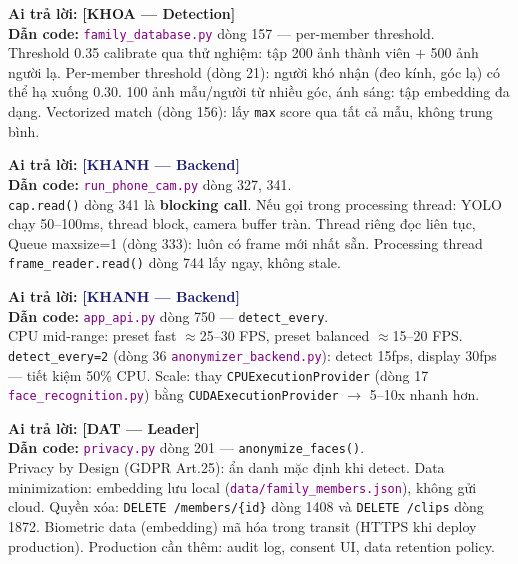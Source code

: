 \documentclass[12pt, a4paper]{article}
\newcommand{\dat}{\textcolor{BrickRed}{\textbf{[DAT --- Leader]}}}
\newcommand{\khanh}{\textcolor{MidnightBlue}{\textbf{[KHANH --- Backend]}}}
\newcommand{\khoa}{\textcolor{OliveGreen}{\textbf{[KHOA --- Detection]}}}
\newcommand{\fpath}[1]{\texttt{\textcolor{purple}{#1}}}
\begin{document}
\begin{tcolorbox}[colback=gray!5, colframe=OliveGreen,
  title={\textbf{Q4: False positive (nhận nhầm người lạ là thành viên) xử lý thế nào?}}, breakable]
\textbf{Ai trả lời:} \khoa\\
\textbf{Dẫn code:} \fpath{family\_database.py} dòng 157 --- per-member threshold.\\
Threshold 0.35 calibrate qua thử nghiệm: tập 200 ảnh thành viên + 500 ảnh người lạ.
Per-member threshold (dòng 21): người khó nhận (đeo kính, góc lạ) có thể hạ xuống 0.30.
100 ảnh mẫu/người từ nhiều góc, ánh sáng: tập embedding đa dạng.
Vectorized match (dòng 156): lấy \texttt{max} score qua tất cả mẫu, không trung bình.
\end{tcolorbox}

\begin{tcolorbox}[colback=gray!5, colframe=MidnightBlue,
  title={\textbf{Q5: Tại sao FrameReader cần thread riêng?}}, breakable]
\textbf{Ai trả lời:} \khanh\\
\textbf{Dẫn code:} \fpath{run\_phone\_cam.py} dòng 327, 341.\\
\texttt{cap.read()} dòng 341 là \textbf{blocking call}.
Nếu gọi trong processing thread: YOLO chạy 50--100ms, thread block, camera buffer tràn.
Thread riêng đọc liên tục, Queue maxsize=1 (dòng 333): luôn có frame mới nhất sẵn.
Processing thread \texttt{frame\_reader.read()} dòng 744 lấy ngay, không stale.
\end{tcolorbox}

\begin{tcolorbox}[colback=gray!5, colframe=MidnightBlue,
  title={\textbf{Q6: FPS thực tế bao nhiêu? Có thể scale?}}, breakable]
\textbf{Ai trả lời:} \khanh\\
\textbf{Dẫn code:} \fpath{app\_api.py} dòng 750 --- \texttt{detect\_every}.\\
CPU mid-range: preset fast $\approx$25--30 FPS, preset balanced $\approx$15--20 FPS.
\texttt{detect\_every=2} (dòng 36 \fpath{anonymizer\_backend.py}): detect 15fps, display 30fps --- tiết kiệm 50\% CPU.
Scale: thay \texttt{CPUExecutionProvider} (dòng 17 \fpath{face\_recognition.py}) bằng \texttt{CUDAExecutionProvider} $\to$ 5--10x nhanh hơn.
\end{tcolorbox}

\begin{tcolorbox}[colback=gray!5, colframe=BrickRed,
  title={\textbf{Q7: GDPR compliant không?}}, breakable]
\textbf{Ai trả lời:} \dat\\
\textbf{Dẫn code:} \fpath{privacy.py} dòng 201 --- \texttt{anonymize\_faces()}.\\
Privacy by Design (GDPR Art.25): ẩn danh mặc định khi detect.
Data minimization: embedding lưu local (\fpath{data/family\_members.json}), không gửi cloud.
Quyền xóa: \texttt{DELETE /members/\{id\}} dòng 1408 và \texttt{DELETE /clips} dòng 1872.
Biometric data (embedding) mã hóa trong transit (HTTPS khi deploy production).
Production cần thêm: audit log, consent UI, data retention policy.
\end{tcolorbox}
\end{document}
